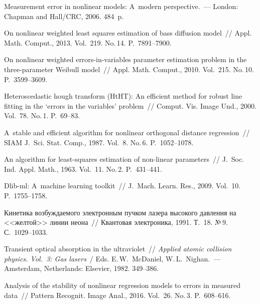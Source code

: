 \begin{multicols}{2}
{{\begin{thebibliography}{99}
{Measurement error in nonlinear models: A~modern perspective}.~---
London: Chapman and Hall/CRC, 2006. 484~p.

On nonlinear weighted least squares
  estimation of bass diffusion model~//
{Appl. Math. Comput.}, 2013.  Vol.~219. No.\,14. P.~7891--7900.

On nonlinear weighted errors-in-variables
  parameter estimation problem in the three-parameter Weibull model~//
{Appl. Math. Comput.}, 2010. Vol.~215. No.\,10. P.~3599--3609.

Heteroscedastic hough transform (HtHT): An
  efficient method for robust line fitting in the `errors in the
  variables' problem~//
{Comput. Vis. Image Und.}, 2000. Vol.~78. No.\,1. P.~69--83.

A~stable and efficient algorithm for nonlinear orthogonal distance regression~//
{SIAM J.~Sci. Stat.  Comp.},   1987. Vol.~8. No.\,6. P.~1052--1078.

  An algorithm for
  least-squares estimation of non-linear parameters~//
{J.~Soc. Ind. Appl.   Math.}, 1963. Vol.~11. No.\,2. P.~431--441.

  Dlib-ml: A~machine
learning toolkit~// {J.~Mach. Learn. Res.}, 2009. Vol.~10. P.~1755--1758.

 Кинетика возбуждаемого электронным пучком 
лазера высокого давления на <<желтой>> линии неона~//
Квантовая электроника, 1991. Т.~18. №\,9. С.~1029--1033.

  Transient optical absorption 
in the ultraviolet~// \textit{Applied atomic collision physics. Vol.~3: Gas lasers}~/
Eds. E.\,W.~McDaniel, W.\,L.~Nighan.~--- Amsterdam, Netherlands:
Elsevier, 1982.  349--386.

  Analysis of the
  stability of nonlinear regression models to errors in measured data~//
{Pattern Recognit. Image Anal.}, 2016. Vol.~26. No.\,3. P.~608--616.
 \end{thebibliography}

 }
 }

\end{multicols}

